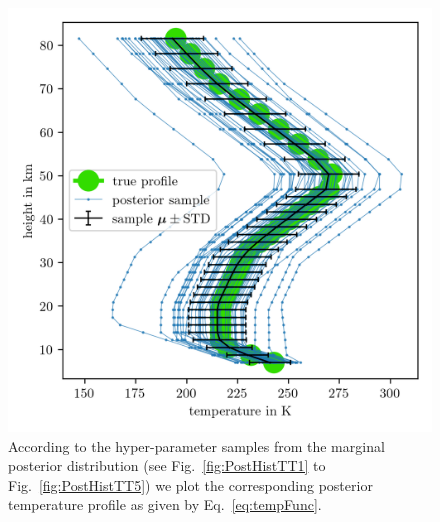 \begin{figure}[ht!]
	\centering
	\includegraphics{TempPostMeanSigm.png} 
	\caption[Temperature posterior samples.]{According to the hyper-parameter samples from the marginal posterior distribution (see Fig.~\ref{fig:PostHistTT1} to Fig.~\ref{fig:PostHistTT5}) we plot the corresponding posterior temperature profile as given by Eq.~\ref{eq:tempFunc}. }
	\label{fig:TempPost}
\end{figure}


